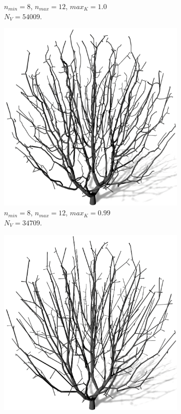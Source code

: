 \begin{figure} [hbtp]
\begin{subfigure}[t]{.45\textwidth}
		\caption{$n_{min} = 8$, $n_{max} = 12$, $max_K = 1.0$\\ $N_V = 54009$.}
		\label{subfig:SCA_Quali_SegmentsHigh}
	\end{subfigure}	
	\begin{subfigure}[t]{.45\textwidth}
		\centering
		\includegraphics[height=.2\textheight]{images/SCA_Quali_CR_Low.png}
		\caption{$n_{min} = 8$, $n_{max} = 12$, $max_K = 0.99$\\ $N_V = 34709$.}
		\label{subfig:SCA_Quali_CR_Low}
	\end{subfigure}
	\hspace{.05\linewidth}
	\begin{subfigure}[t]{.45\textwidth}
		\centering
		\includegraphics[height=.2\textheight]{images/SCA_Quali_CR_High.png}

\end{subfigure}
\end{figure}
